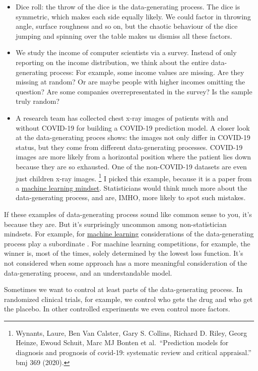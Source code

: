\documentclass[
  10pt,
]{scrbook}
\providecommand{\tightlist}{%
  \setlength{\itemsep}{0pt}\setlength{\parskip}{0pt}}
\begin{document}
\begin{itemize}
\tightlist
\item
  Dice roll: the throw of the dice is the data-generating process. The dice is symmetric, which makes each side equally likely. We could factor in throwing angle, surface roughness and so on, but the chaotic behaviour of the dice jumping and spinning over the table makes us dismiss all these factors.
\item
  We study the income of computer scientists via a survey. Instead of only reporting on the income distribution, we think about the entire data-generating process: For example, some income values are missing. Are they missing at random? Or are maybe people with higher incomes omitting the question? Are some companies overrepresentated in the survey? Is the sample truly random?
\item
  A research team has collected chest x-ray images of patients with and without COVID-19 for building a COVID-19 prediction model. A closer look at the data-generating proces shows: the images not only differ in COVID-19 status, but they come from different data-generating processes. COVID-19 images are more likely from a horizontal position where the patient lies down because they are so exhausted. One of the non-COVID-19 datasets are even just children x-ray images. \footnote{Wynants, Laure, Ben Van Calster, Gary S. Collins, Richard D. Riley, Georg Heinze, Ewoud Schuit, Marc MJ Bonten et al.~``Prediction models for diagnosis and prognosis of covid-19: systematic review and critical appraisal.'' bmj 369 (2020).} I picked this example, because it is a paper from a \protect\hyperlink{machine-learning}{machine learning mindset}. Statisticians would think much more about the data-generating process, and are, IMHO, more likely to spot such mistakes.
\end{itemize}

If these examples of data-generating process sound like common sense to you, it's because they are.
But it's surprisingly uncommon among non-statistician mindsets.
For example, for \protect\hyperlink{machine-learning}{machine learning} considerations of the data-generating process play a subordinate .
For machine learning competitions, for example, the winner is, most of the times, solely determined by the lowest loss function.
It's not considered when some approach has a more meaningful consideration of the data-generating process, and an understandable model.

Sometimes we want to control at least parts of the data-generating process.
In randomized clinical trials, for example, we control who gets the drug and who get the placebo.
In other controlled experiments we even control more factors.
\end{document}

